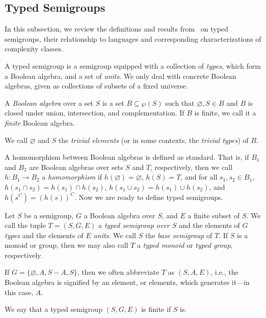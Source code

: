 \documentclass[a4paper,UKenglish,cleveref, autoref, thm-restate, anonymous]{lipics-v2021}
\begin{document}


\subsection{Typed Semigroups}\label{sec:backgroundtyped}

In this subsection, we review the definitions and results from~\cite{REF1,REF2} on typed semigroups, their relationship to languages and corresponding characterizations of complexity classes.

A typed semigroup is a semigroup equipped with a collection of \emph{types}, which form a Boolean algebra, and a set of \emph{units}.  We only deal with concrete Boolean algebras, given as collections of subsets of a fixed universe.

\begin{definition}
    A \emph{Boolean algebra} over a set $S$ is a set $B \subseteq \wp(S)$ such that $\varnothing, S \in B$ and $B$ is closed under union, intersection, and complementation. If $B$ is finite, we call it a \emph{finite} Boolean algebra.

    We call $\varnothing$ and $S$ the \emph{trivial elements} (or in some contexts, the \emph{trivial types}) of $B$.
\end{definition}

A homomorphism between Boolean algebras is defined as standard.  That is, if $B_1$ and $B_2$ are Boolean algebras over sets $S$ and $T$, respectively, then we call $h : B_1 \rightarrow B_2$ a \emph{homomorphism} if $h(\varnothing) = \varnothing$, $h(S) = T$, and for all $s_1, s_2 \in B_1$, $h(s_1 \cap s_2) = h(s_1) \cap h(s_2)$, $h(s_1 \cup s_2) = h(s_1) \cup h(s_2)$, and $h(s^C) = (h(s))^C$.
Now we are ready to define typed semigroups.

\begin{definition}
    Let $S$ be a semigroup, $G$ a Boolean algebra over $S$, and $E$ a finite subset of $S$. We call the tuple $T = (S, G, E)$ a \emph{typed semigroup over $S$} and the elements of $G$ \emph{types} and the elements of $E$ \emph{units}. We call $S$ the \emph{base semigroup} of $T$. If $S$ is a monoid or group, then we may also call $T$ a \emph{typed monoid} or \emph{typed group}, respectively.

    If $G = \{\varnothing, A, S - A, S\}$, then we often abbreviate $T$ as $(S, A, E)$, i.e., the Boolean algebra is signified by an element, or elements, which generates it---in this case, $A$. 
\end{definition}
We say that a typed semigroup $(S,G,E)$ is finite if $S$ is.
\end{document}
